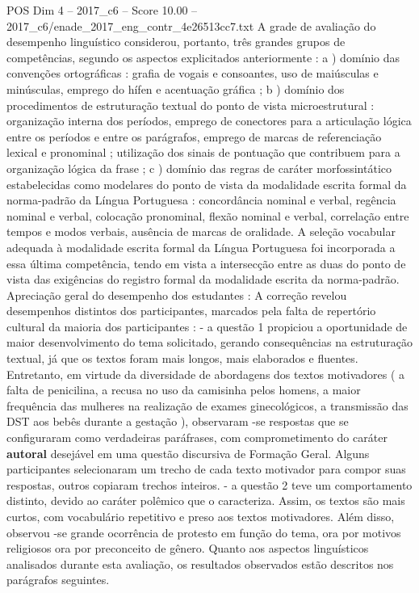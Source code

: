 \begin{textsample}{POS Dim 4 – 2017\_c6 – Score 10.00 – 2017\_c6/enade\_2017\_eng\_contr\_4e26513cc7.txt}
A grade de avaliação do desempenho linguístico considerou, portanto, três grandes grupos de competências, segundo os aspectos explicitados anteriormente : a ) domínio das convenções ortográficas : grafia de vogais e consoantes, uso de maiúsculas e minúsculas, emprego do hífen e acentuação gráfica ; b ) domínio dos procedimentos de estruturação textual do ponto de vista microestrutural : organização interna dos períodos, emprego de conectores para a articulação lógica entre os períodos e entre os parágrafos, emprego de marcas de referenciação lexical e pronominal ; utilização dos sinais de pontuação que contribuem para a organização lógica da frase ; c ) domínio das regras de caráter morfossintático estabelecidas como modelares do ponto de vista da modalidade escrita formal da norma-padrão da Língua Portuguesa : concordância nominal e verbal, regência nominal e verbal, colocação pronominal, flexão nominal e verbal, correlação entre tempos e modos verbais, ausência de marcas de oralidade.
A seleção vocabular adequada à modalidade escrita formal da Língua Portuguesa foi incorporada a essa última competência, tendo em vista a intersecção entre as duas do ponto de vista das exigências do registro formal da modalidade escrita da norma-padrão.
Apreciação geral do desempenho dos estudantes : A correção revelou desempenhos distintos dos participantes, marcados pela falta de repertório cultural da maioria dos participantes : - a questão 1 propiciou a oportunidade de maior desenvolvimento do tema solicitado, gerando consequências na estruturação textual, já que os textos foram mais longos, mais elaborados e fluentes.
Entretanto, em virtude da diversidade de abordagens dos textos motivadores ( a falta de penicilina, a recusa no uso da camisinha pelos homens, a maior frequência das mulheres na realização de exames ginecológicos, a transmissão das DST aos bebês durante a gestação ), observaram -se respostas que se configuraram como verdadeiras paráfrases, com comprometimento do caráter \textbf{autoral} desejável em uma questão discursiva de Formação Geral.
Alguns participantes selecionaram um trecho de cada texto motivador para compor suas respostas, outros copiaram trechos inteiros. - a questão 2 teve um comportamento distinto, devido ao caráter polêmico que o caracteriza.
Assim, os textos são mais curtos, com vocabulário repetitivo e preso aos textos motivadores.
Além disso, observou -se grande ocorrência de protesto em função do tema, ora por motivos religiosos ora por preconceito de gênero.
Quanto aos aspectos linguísticos analisados durante esta avaliação, os resultados observados estão descritos nos parágrafos seguintes.

\end{textsample}
